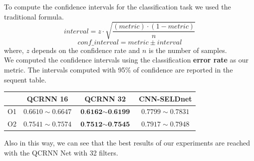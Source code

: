 \documentclass{article}
\begin{document}
    To compute the confidence intervals for the classification task we used the traditional formula.
    \[interval = z \cdot \sqrt{\frac{(metric)\cdot (1-metric)}{n}} \]
    \[conf\_ interval = metric \pm interval \]
    where, $z$ depends on the confidence rate and $n$ is the number of samples.\\
    We computed the confidence intervals using the classification \textbf{error rate} as our metric. The intervals computed with 95\% of confidence are reported in the sequent table.\\
    \FloatBarrier
    \begin{table}[h!]
    \centering
    \begin{tabular}{c|c|c|c}
    & QCRNN 16 & QCRNN 32 & CNN-SELDnet \\
    \hline
    O1 & $0.6610\sim 0.6647$ & $\textbf{0.6162}\sim \textbf{0.6199}$ & $0.7799\sim 0.7831$\\
    \hline
    O2 & $0.7541\sim 0.7574$& $\textbf{0.7512}\sim \textbf{0.7545}$& $0.7917\sim 0.7948$\\
    \end{tabular}
    \end{table}
    \FloatBarrier
    Also in this way, we can see that the best results of our experiments are reached with the QCRNN Net with 32 filters.
\end{document}
